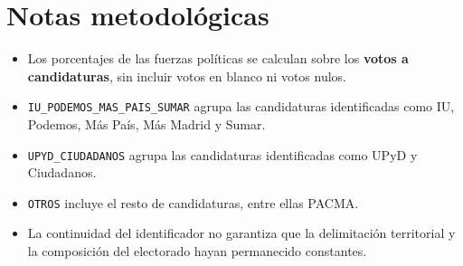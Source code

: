 \documentclass[
  spanish,
  10pt,
  a4paper,
  DIV=11,
  numbers=noendperiod]{scrartcl}
\providecommand{\tightlist}{%
  \setlength{\itemsep}{0pt}\setlength{\parskip}{0pt}}
\begin{document}
\section{Notas metodológicas}\label{notas-metodoluxf3gicas}

\begin{itemize}
\tightlist
\item
  Los porcentajes de las fuerzas políticas se calculan sobre los
  \textbf{votos a candidaturas}, sin incluir votos en blanco ni votos
  nulos.
\item
  \texttt{IU\_PODEMOS\_MAS\_PAIS\_SUMAR} agrupa las candidaturas
  identificadas como IU, Podemos, Más País, Más Madrid y Sumar.
\item
  \texttt{UPYD\_CIUDADANOS} agrupa las candidaturas identificadas como
  UPyD y Ciudadanos.
\item
  \texttt{OTROS} incluye el resto de candidaturas, entre ellas PACMA.
\item
  La continuidad del identificador no garantiza que la delimitación
  territorial y la composición del electorado hayan permanecido
  constantes.
\end{itemize}
\end{document}
